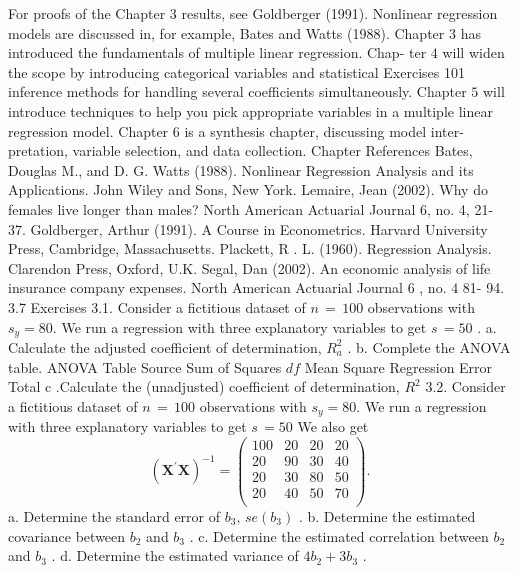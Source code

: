 \documentclass[11pt]{article}
\begin{document}
For proofs of the Chapter 3 results, see Goldberger (1991). Nonlinear regression
models are discussed in, for example, Bates and Watts (1988).
 Chapter 3 has introduced the fundamentals of multiple linear regression. Chap-
ter \(4\) will widen the scope by introducing categorical variables and statistical
 Exercises 101
inference methods for handling several coefficients simultaneously. Chapter \(5\)
will introduce techniques to help you pick appropriate variables in a multiple
 linear regression model. Chapter \(6\) is a synthesis chapter, discussing model inter-
 pretation, variable selection, and data collection.
Chapter References
 Bates, Douglas M., and D. G. Watts (1988). Nonlinear Regression Analysis and its Applications.
John Wiley and Sons, New York.
Lemaire, Jean (2002). Why do females live longer than males? North American Actuarial
 Journal 6, no. 4, 21- 37.
Goldberger, Arthur (1991). A Course in Econometrics. Harvard University Press, Cambridge,
Massachusetts.
Plackett, \(\mathrm{R}\) . L. (1960). Regression Analysis. Clarendon Press, Oxford, U.K.
 Segal, Dan (2002). An economic analysis of life insurance company expenses. North American
 Actuarial Journal \(6\) , no. \(4\) 81- 94.
3.7 Exercises
3.1. Consider a fictitious dataset of \(n \,=\, 1 0 0\) observations with \(s_{y}=8 0 .\) We run
 a regression with three explanatory variables to get \(s \,=5 0\) .
a. Calculate the adjusted coefficient of determination, \(R_{a}^{2}\) .
b. Complete the ANOVA table.
ANOVA Table
Source Sum of Squares \(d f\) Mean Square
Regression
Error
Total
\(\mathrm{c}\) .Calculate the (unadjusted) coefficient of determination, \(R^{2}\)
3.2. Consider a fictitious dataset of \(n \,=\, 1 0 0\) observations with \(s_{y}=8 0 .\) We run
 a regression with three explanatory variables to get \(s \,=5 0\) We also get
\[
\left( \mathbf{X}^{\prime} \mathbf{X} \right)^{-1}=\left( \begin{matrix} {1 0 0} & {2 0} & {2 0} & {2 0} \\ {2 0} & {9 0} & {3 0} & {4 0} \\ {2 0} & {3 0} & {8 0} & {5 0} \\ {2 0} & {4 0} & {5 0} & {7 0} \\ \end{matrix} \right) .
\]
 a. Determine the standard error of \(b_{3} , \, s e ( b_{3} )\) .
b. Determine the estimated covariance between \(b_{2}\) and \(b_{3}\) .
 c. Determine the estimated correlation between \(b_{2}\) and \(b_{3}\) .
d. Determine the estimated variance of \(4 b_{2}+3 b_{3}\) .
\clearpage
\end{document}
